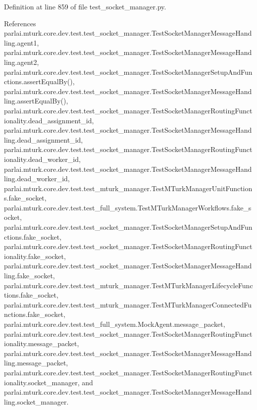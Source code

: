 Definition at line 859 of file test\+\_\+socket\+\_\+manager.\+py.



References parlai.\+mturk.\+core.\+dev.\+test.\+test\+\_\+socket\+\_\+manager.\+Test\+Socket\+Manager\+Message\+Handling.\+agent1, parlai.\+mturk.\+core.\+dev.\+test.\+test\+\_\+socket\+\_\+manager.\+Test\+Socket\+Manager\+Message\+Handling.\+agent2, parlai.\+mturk.\+core.\+dev.\+test.\+test\+\_\+socket\+\_\+manager.\+Test\+Socket\+Manager\+Setup\+And\+Functions.\+assert\+Equal\+By(), parlai.\+mturk.\+core.\+dev.\+test.\+test\+\_\+socket\+\_\+manager.\+Test\+Socket\+Manager\+Message\+Handling.\+assert\+Equal\+By(), parlai.\+mturk.\+core.\+dev.\+test.\+test\+\_\+socket\+\_\+manager.\+Test\+Socket\+Manager\+Routing\+Functionality.\+dead\+\_\+assignment\+\_\+id, parlai.\+mturk.\+core.\+dev.\+test.\+test\+\_\+socket\+\_\+manager.\+Test\+Socket\+Manager\+Message\+Handling.\+dead\+\_\+assignment\+\_\+id, parlai.\+mturk.\+core.\+dev.\+test.\+test\+\_\+socket\+\_\+manager.\+Test\+Socket\+Manager\+Routing\+Functionality.\+dead\+\_\+worker\+\_\+id, parlai.\+mturk.\+core.\+dev.\+test.\+test\+\_\+socket\+\_\+manager.\+Test\+Socket\+Manager\+Message\+Handling.\+dead\+\_\+worker\+\_\+id, parlai.\+mturk.\+core.\+dev.\+test.\+test\+\_\+mturk\+\_\+manager.\+Test\+M\+Turk\+Manager\+Unit\+Functions.\+fake\+\_\+socket, parlai.\+mturk.\+core.\+dev.\+test.\+test\+\_\+full\+\_\+system.\+Test\+M\+Turk\+Manager\+Workflows.\+fake\+\_\+socket, parlai.\+mturk.\+core.\+dev.\+test.\+test\+\_\+socket\+\_\+manager.\+Test\+Socket\+Manager\+Setup\+And\+Functions.\+fake\+\_\+socket, parlai.\+mturk.\+core.\+dev.\+test.\+test\+\_\+socket\+\_\+manager.\+Test\+Socket\+Manager\+Routing\+Functionality.\+fake\+\_\+socket, parlai.\+mturk.\+core.\+dev.\+test.\+test\+\_\+socket\+\_\+manager.\+Test\+Socket\+Manager\+Message\+Handling.\+fake\+\_\+socket, parlai.\+mturk.\+core.\+dev.\+test.\+test\+\_\+mturk\+\_\+manager.\+Test\+M\+Turk\+Manager\+Lifecycle\+Functions.\+fake\+\_\+socket, parlai.\+mturk.\+core.\+dev.\+test.\+test\+\_\+mturk\+\_\+manager.\+Test\+M\+Turk\+Manager\+Connected\+Functions.\+fake\+\_\+socket, parlai.\+mturk.\+core.\+dev.\+test.\+test\+\_\+full\+\_\+system.\+Mock\+Agent.\+message\+\_\+packet, parlai.\+mturk.\+core.\+dev.\+test.\+test\+\_\+socket\+\_\+manager.\+Test\+Socket\+Manager\+Routing\+Functionality.\+message\+\_\+packet, parlai.\+mturk.\+core.\+dev.\+test.\+test\+\_\+socket\+\_\+manager.\+Test\+Socket\+Manager\+Message\+Handling.\+message\+\_\+packet, parlai.\+mturk.\+core.\+dev.\+test.\+test\+\_\+socket\+\_\+manager.\+Test\+Socket\+Manager\+Routing\+Functionality.\+socket\+\_\+manager, and parlai.\+mturk.\+core.\+dev.\+test.\+test\+\_\+socket\+\_\+manager.\+Test\+Socket\+Manager\+Message\+Handling.\+socket\+\_\+manager.

